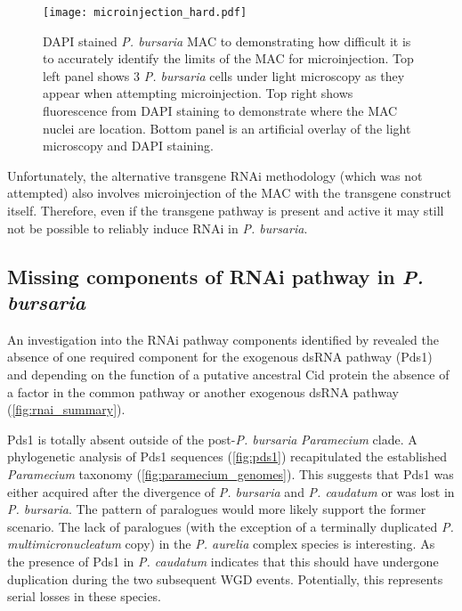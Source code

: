 \begin{figure}
    \centering
    \texttt{[image: microinjection\_hard.pdf]}
    \caption[DAPI stained \textit{P. bursaria} MAC]{
        DAPI stained \textit{P. bursaria}
        MAC to demonstrating how difficult it is to accurately identify the limits
        of the MAC for microinjection.  Top left panel shows 3 \textit{P. bursaria}
    cells under light microscopy as they appear when attempting
microinjection. Top right shows fluorescence from DAPI staining to demonstrate
where the MAC nuclei are location.  Bottom panel is an artificial overlay
of the light microscopy and DAPI staining.}
    \label{fig:microinjection_nucleus}
\end{figure}

Unfortunately, the alternative transgene RNAi methodology \citep{Galvani2001} 
(which was not attempted) also involves microinjection of the MAC with
the transgene construct itself.  Therefore, even if the transgene
pathway is present and active it may still not be possible to reliably
induce RNAi in \textit{P. bursaria}.

\subsection{Missing components of RNAi pathway in \textit{P. bursaria}}

An investigation into the RNAi pathway components identified by \citep{Marker2014}
revealed the absence of one required component for the exogenous dsRNA
pathway (Pds1) and depending on the function of a putative ancestral
Cid protein the absence of a factor in the common pathway or another
exogenous dsRNA pathway (\cref{fig:rnai_summary}).


Pds1 is totally absent outside of the post-\textit{P. bursaria} 
\textit{Paramecium} clade.
A phylogenetic analysis of Pds1 sequences (\cref{fig:pds1}) 
recapitulated the established 
\textit{Paramecium} taxonomy (\cref{fig:paramecium_genomes}).
This suggests that Pds1 was either acquired after the divergence of \textit{P. bursaria}
and \textit{P. caudatum} or was lost in \textit{P. bursaria}.
The pattern of paralogues would more likely support the former scenario.
The lack of paralogues (with the exception of a terminally duplicated \textit{P. multimicronucleatum}
copy) in the \textit{P. aurelia} complex species is interesting.  As the presence
of Pds1 in \textit{P. caudatum} indicates that this should have undergone
duplication during the two subsequent WGD events.  Potentially, this represents
serial losses in these species.


